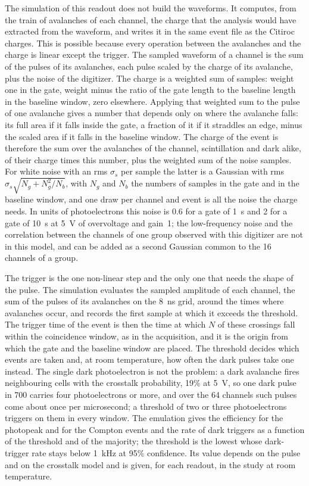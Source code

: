 \documentclass[11pt]{article}
\newcommand{\us}{\textmu s\xspace}
\begin{document}
The simulation of this readout does not build the waveforms. It computes,
from the train of avalanches of each channel, the charge that the analysis
would have extracted from the waveform, and writes it in the same event
file as the Citiroc charges. This is possible because every operation
between the avalanches and the charge is linear except the trigger. The
sampled waveform of a channel is the sum of the pulses of its avalanches,
each pulse scaled by the charge of its avalanche, plus the noise of the
digitizer. The charge is a weighted sum of samples: weight one in the gate,
weight minus the ratio of the gate length to the baseline length in the
baseline window, zero elsewhere. Applying that weighted sum to the pulse of
one avalanche gives a number that depends only on where the avalanche falls:
its full area if it falls inside the gate, a fraction of it if it straddles
an edge, minus the scaled area if it falls in the baseline window. The
charge of the event is therefore the sum over the avalanches of the channel,
scintillation and dark alike, of their charge times this number, plus the
weighted sum of the noise samples. For white noise with an rms $\sigma_s$
per sample the latter is a Gaussian with rms
$\sigma_s \sqrt{N_g + N_g^2/N_b}$, with $N_g$ and $N_b$ the numbers of
samples in the gate and in the baseline window, and one draw per channel
and event is all the noise the charge needs. In units of photoelectrons
this noise is 0.6 for a gate of 1~\us and 2 for a gate of 10~\us at 5~V of
overvoltage and gain~1; the low-frequency noise and the correlation
between the channels of one group observed with this digitizer are not in
this model, and can be added as a second Gaussian common to the 16 channels
of a group.

The trigger is the one non-linear step and the only one that needs the
shape of the pulse. The simulation evaluates the sampled amplitude of each
channel, the sum of the pulses of its avalanches on the 8~ns grid, around
the times where avalanches occur, and records the first sample at which it
exceeds the threshold. The trigger time of the event is then the time at
which $N$ of these crossings fall within the coincidence window, as in the
acquisition, and it is the origin from which the gate and the baseline
window are placed. The threshold decides which events are taken and, at
room temperature, how often the dark pulses take one instead. The
single dark photoelectron is not the problem: a dark avalanche fires
neighbouring cells with the crosstalk probability, 19\% at 5~V, so one dark
pulse in 700 carries four photoelectrons or more, and over the 64 channels
such pulses come about once per microsecond; a threshold of two or three
photoelectrons triggers on them in every window. The emulation gives the
efficiency for the photopeak and for the Compton events and the rate of
dark triggers as a function of the threshold and of the majority; the
threshold is the lowest whose dark-trigger rate stays below 1~kHz at 95\%
confidence. Its value depends on the pulse and on the crosstalk model and
is given, for each readout, in the study at room temperature.
\end{document}
